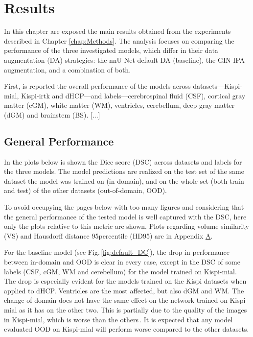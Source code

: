 \chapter{Results} \label{chap:Results}
\vspace{1cm}

In this chapter are exposed the main results obtained from the experiments described in Chapter \ref{chap:Methods}. The analysis focuses on comparing the performance of the three investigated models, which differ in their data augmentation (DA) strategies: the nnU-Net default DA (baseline), the GIN-IPA augmentation, and a combination of both.

First, is reported the overall performance of the models across datasets---Kispi-mial, Kispi-irtk and dHCP---and labels---cerebrospinal fluid (CSF), cortical gray matter (cGM), white matter (WM), ventricles, cerebellum, deep gray matter (dGM) and brainstem (BS). [...]

\section{General Performance} \label{sec:GeneralPerformance}
In the plots below is shown the Dice score (DSC) across datasets and labels for the three models. The model predictions are realized on the test set of the same dataset the model was trained on (in-domain), and on the whole set (both train and test) of the other datasets (out-of-domain, OOD).

To avoid occupying the pages below with too many figures and considering that the general performance of the tested model is well captured with the DSC, here only the plots relative to this metric are shown. Plots regarding volume similarity (VS) and Hausdorff distance 95\th percentile (HD95) are in Appendix \hyperref[app:SupplementaryPlots]{A}.

For the baseline model (see Fig.\,\ref{fig:default_DC}), the drop in performance between in-domain and OOD is clear in every case, except in the DSC of some labels (CSF, cGM, WM and cerebellum) for the model trained on Kispi-mial. The drop is especially evident for the models trained on the Kispi datasets when applied to dHCP. Ventricles are the most affected, but also dGM and WM. The change of domain does not have the same effect on the network trained on Kispi-mial as it has on the other two. This is partially due to the quality of the images in Kispi-mial, which is worse than the others\,\cite{FeTA2022_review}. It is expected that any model evaluated OOD on Kispi-mial will perform worse compared to the other datasets.

